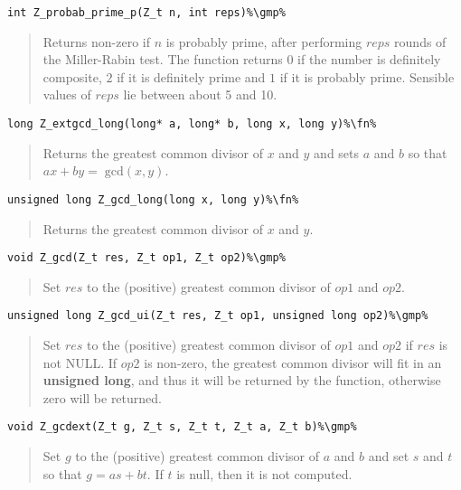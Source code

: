 \documentclass[a4paper,10pt]{article}
\newcommand{\fn}{\hfill[Function]}
\newcommand{\gmp}{\hfill[GMP]}
\begin{document}
\begin{lstlisting}
int Z_probab_prime_p(Z_t n, int reps)%\gmp%
\end{lstlisting}
\begin{quote}Returns non-zero if $n$ is probably prime, after performing $reps$ rounds of the Miller-Rabin test. The function returns $0$ if the number is definitely composite, $2$ if it is definitely prime and $1$ if it is probably prime. Sensible values of $reps$ lie between about 5 and 10.\end{quote}

\begin{lstlisting}
long Z_extgcd_long(long* a, long* b, long x, long y)%\fn%
\end{lstlisting}
\begin{quote}Returns the greatest common divisor of $x$ and $y$ and sets $a$ and $b$ so that $ax + by = \;\mbox{gcd}(x,y)$.\end{quote}

\begin{lstlisting}
unsigned long Z_gcd_long(long x, long y)%\fn%
\end{lstlisting}
\begin{quote}Returns the greatest common divisor of $x$ and $y$.\end{quote}

\begin{lstlisting}
void Z_gcd(Z_t res, Z_t op1, Z_t op2)%\gmp%
\end{lstlisting}
\begin{quote}Set $res$ to the (positive) greatest common divisor of $op1$ and $op2$.\end{quote}

\begin{lstlisting}
unsigned long Z_gcd_ui(Z_t res, Z_t op1, unsigned long op2)%\gmp%
\end{lstlisting}
\begin{quote}Set $res$ to the (positive) greatest common divisor of $op1$ and $op2$ if $res$ is not NULL. If $op2$ is non-zero, the greatest common divisor will fit in an \textbf{unsigned long}, and thus it will be returned by the function, otherwise zero will be returned.\end{quote}

\begin{lstlisting}
void Z_gcdext(Z_t g, Z_t s, Z_t t, Z_t a, Z_t b)%\gmp%
\end{lstlisting}
\begin{quote}Set $g$ to the (positive) greatest common divisor of $a$ and $b$ and set $s$ and $t$ so that $g = as + bt$. If $t$ is null, then it is not computed.\end{quote}
\end{document}
